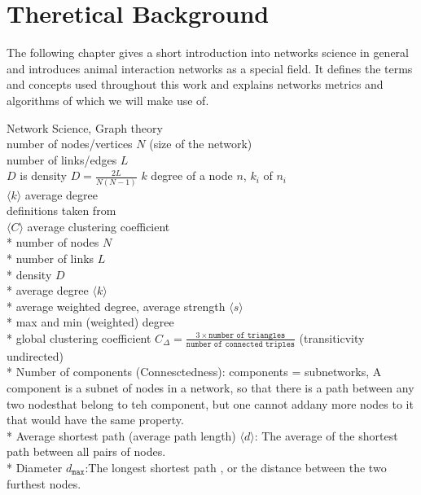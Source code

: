 \chapter{Theretical Background}
The following chapter gives a short introduction into networks science in general and introduces animal interaction networks as a special field. It defines the terms and concepts used throughout this work and explains networks metrics and algorithms of which we will make use of.

 
Network Science, Graph theory\\
number of nodes/vertices $N$ (size of the network)\\
number of links/edges $L$\\
$D$ is density $D=\frac{2L}{N(N-1)}$
$k$ degree of a node $n$, $k_i$ of $n_i$\\
$ \langle k  \rangle$ average degree\\
definitions taken from~\textcite{barabasi2016network}\\

$\langle C \rangle$ average clustering coefficient\\

* number of nodes $N$\\
* number of links $L$\\
* density $D$\\
* average degree $ \langle k  \rangle$\\
* average weighted degree, average strength $\langle s \rangle$\\ 
* max and min (weighted) degree\\
* global clustering coefficient $C_\Delta = \frac{3 \times \texttt{number of triangles}}{\texttt{number of connected triples}}$ (transiticvity undirected)~\cite{wasserman1994social}\\

* Number of components (Connesctedness): components = subnetworks, A component is a subnet of nodes in a network, so that there is a path between any two nodesthat belong to teh component, but one cannot addany more nodes to it that would have the same property.\\

* Average shortest path (average path length) $\langle d \rangle$: The average of the shortest path between all pairs of nodes.\\

* Diameter $d_{\texttt{max}}$:The longest shortest path , or the distance between the two furthest nodes.\\




